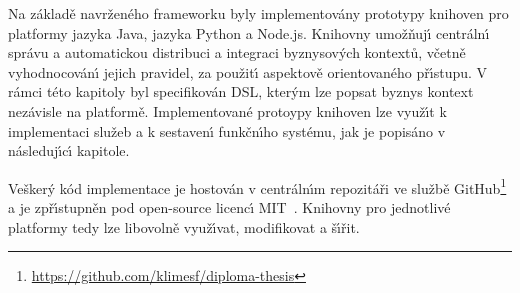 Na základě navrženého frameworku byly implementovány prototypy
knihoven pro platformy jazyka Java, jazyka Python a
Node.js. Knihovny umožňuj\'{\i} centráln\'{\i} správu a automatickou distribuci a integraci
byznysov\'ych kontextů, včetně vyhodnocován\'{\i} jejich pravidel, za
použit\'{\i} aspektově orientovaného př\'{\i}stupu.
V rámci této kapitoly byl specifikován \gls{DSL}, kter\'ym lze popsat
byznys kontext nezávisle na platformě.
Implementované protoypy knihoven lze využ\'{\i}t k implementaci služeb a k sestaven\'{\i}
funkčn\'{\i}ho systému, jak je popisáno v následuj\'{\i}c\'{\i} kapitole.

Vešker\'y kód implementace je hostován v centráln\'{\i}m repozitáři
ve službě GitHub\footnote{\url{https://github.com/klimesf/diploma-thesis}}
a je zpř\'{\i}stupněn pod open-source licenc\'{\i} \gls{MIT}~\cite{mitlicense}.
Knihovny pro jednotlivé platformy tedy lze libovolně
využ\'{\i}vat, modifikovat a š\'{\i}řit.
